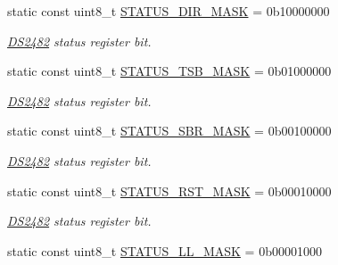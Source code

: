 \begin{DoxyCompactItemize}
\mbox{\label{class_d_s2482_command_ac7f8ad7959c12f42ee28411f0d557f4c}} 
static const uint8\+\_\+t \mbox{\hyperlink{class_d_s2482_command_ac7f8ad7959c12f42ee28411f0d557f4c}{S\+T\+A\+T\+U\+S\+\_\+\+D\+I\+R\+\_\+\+M\+A\+SK}} = 0b10000000
\begin{DoxyCompactList}\small\item\em \mbox{\hyperlink{class_d_s2482}{D\+S2482}} status register bit. \end{DoxyCompactList}\item 
\mbox{\label{class_d_s2482_command_ab240a7d5eb952940530b43f67e468a64}} 
static const uint8\+\_\+t \mbox{\hyperlink{class_d_s2482_command_ab240a7d5eb952940530b43f67e468a64}{S\+T\+A\+T\+U\+S\+\_\+\+T\+S\+B\+\_\+\+M\+A\+SK}} = 0b01000000
\begin{DoxyCompactList}\small\item\em \mbox{\hyperlink{class_d_s2482}{D\+S2482}} status register bit. \end{DoxyCompactList}\item 
\mbox{\label{class_d_s2482_command_a7e777aa12edcfeb6cca4b516369993ae}} 
static const uint8\+\_\+t \mbox{\hyperlink{class_d_s2482_command_a7e777aa12edcfeb6cca4b516369993ae}{S\+T\+A\+T\+U\+S\+\_\+\+S\+B\+R\+\_\+\+M\+A\+SK}} = 0b00100000
\begin{DoxyCompactList}\small\item\em \mbox{\hyperlink{class_d_s2482}{D\+S2482}} status register bit. \end{DoxyCompactList}\item 
\mbox{\label{class_d_s2482_command_ab7e3aa0bc77430f00cf803e1d215113d}} 
static const uint8\+\_\+t \mbox{\hyperlink{class_d_s2482_command_ab7e3aa0bc77430f00cf803e1d215113d}{S\+T\+A\+T\+U\+S\+\_\+\+R\+S\+T\+\_\+\+M\+A\+SK}} = 0b00010000
\begin{DoxyCompactList}\small\item\em \mbox{\hyperlink{class_d_s2482}{D\+S2482}} status register bit. \end{DoxyCompactList}\item 
\mbox{\label{class_d_s2482_command_a1586e3d6778ff31eb1b94065c6ce406f}} 
static const uint8\+\_\+t \mbox{\hyperlink{class_d_s2482_command_a1586e3d6778ff31eb1b94065c6ce406f}{S\+T\+A\+T\+U\+S\+\_\+\+L\+L\+\_\+\+M\+A\+SK}} = 0b00001000

\end{DoxyCompactItemize}
